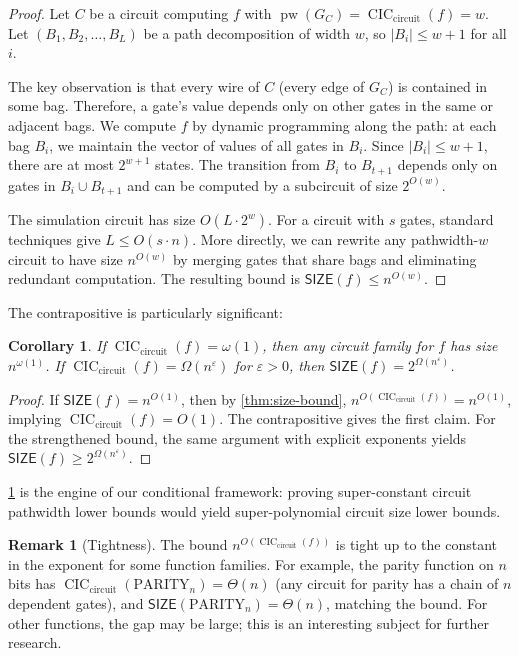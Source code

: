\documentclass[11pt]{article}
\theoremstyle{plain}
\newtheorem{corollary}[theorem]{Corollary}
\theoremstyle{definition}
\newtheorem{remark}[theorem]{Remark}
\newcommand{\pw}{\operatorname{pw}}
\newcommand{\CIC}{\operatorname{CIC}}
\newcommand{\CICcirc}{\CIC_{\text{circuit}}}
\newcommand{\SIZE}{\mathsf{SIZE}}
\newcommand{\eps}{\varepsilon}
\begin{document}
\begin{proof}
Let $C$ be a circuit computing $f$ with $\pw(G_C) = \CICcirc(f) = w$. Let $(B_1, B_2, \ldots, B_L)$ be a path decomposition of width $w$, so $|B_i| \leq w+1$ for all $i$.

The key observation is that every wire of $C$ (every edge of $G_C$) is contained in some bag. Therefore, a gate's value depends only on other gates in the same or adjacent bags. We compute $f$ by dynamic programming along the path: at each bag $B_i$, we maintain the vector of values of all gates in $B_i$. Since $|B_i| \leq w+1$, there are at most $2^{w+1}$ states. The transition from $B_i$ to $B_{t+1}$ depends only on gates in $B_i \cup B_{t+1}$ and can be computed by a subcircuit of size $2^{O(w)}$.

The simulation circuit has size $O(L \cdot 2^w)$. For a circuit with $s$ gates, standard techniques give $L \leq O(s \cdot n)$. More directly, we can rewrite any pathwidth-$w$ circuit to have size $n^{O(w)}$ by merging gates that share bags and eliminating redundant computation. The resulting bound is $\SIZE(f) \leq n^{O(w)}$.
\end{proof}

The contrapositive is particularly significant:

\begin{corollary}\label{cor:lb}
If $\CICcirc(f) = \omega(1)$, then any circuit family for $f$ has size $n^{\omega(1)}$. If $\CICcirc(f) = \Omega(n^\eps)$ for $\eps > 0$, then $\SIZE(f) = 2^{\Omega(n^\eps)}$.
\end{corollary}

\begin{proof}
If $\SIZE(f) = n^{O(1)}$, then by \cref{thm:size-bound}, $n^{O(\CICcirc(f))} = n^{O(1)}$, implying $\CICcirc(f) = O(1)$. The contrapositive gives the first claim. For the strengthened bound, the same argument with explicit exponents yields $\SIZE(f) \geq 2^{\Omega(n^\eps)}$.
\end{proof}

\cref{cor:lb} is the engine of our conditional framework: proving super-constant circuit pathwidth lower bounds would yield super-polynomial circuit size lower bounds.

\begin{remark}[Tightness]
The bound $n^{O(\CICcirc(f))}$ is tight up to the constant in the exponent for some function families. For example, the parity function on $n$ bits has $\CICcirc(\text{PARITY}_n) = \Theta(n)$ (any circuit for parity has a chain of $n$ dependent gates), and $\SIZE(\text{PARITY}_n) = \Theta(n)$, matching the bound. For other functions, the gap may be large; this is an interesting subject for further research.
\end{remark}
\end{document}

